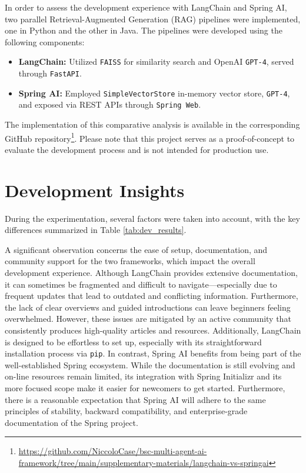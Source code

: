 In order to assess the development experience with LangChain and Spring AI, two parallel Retrieval-Augmented Generation (RAG) pipelines were implemented, one in Python and the other in Java. The pipelines were developed using the following components:

\begin{itemize}[leftmargin=*, label=--] 
    \item \textbf{LangChain:} Utilized \texttt{FAISS} for similarity search and OpenAI \texttt{GPT-4}, served through \texttt{FastAPI}. 
    \item \textbf{Spring AI:} Employed \texttt{SimpleVectorStore} in-memory vector store, \texttt{GPT-4}, and exposed via REST APIs through \texttt{Spring Web}. 
\end{itemize}
    
The implementation of this comparative analysis is available in the corresponding GitHub repository\footnote{\url{https://github.com/NiccoloCase/bsc-multi-agent-ai-framework/tree/main/supplementary-materials/langchain-vs-springai}}. Please note that this project serves as a proof-of-concept to evaluate the development process and is not intended for production use.


\section*{Development Insights}

During the experimentation, several factors were taken into account, with the key differences summarized in Table \ref{tab:dev_results}.

A significant observation concerns the ease of setup, documentation, and community support for the two frameworks, which impact the overall development experience. Although LangChain provides extensive documentation, it can sometimes be fragmented and difficult to navigate—especially due to frequent updates that lead to outdated and conflicting information. Furthermore, the lack of clear overviews and guided introductions can leave beginners feeling overwhelmed. 
However, these issues are mitigated by an active community that consistently produces high-quality articles and resources. Additionally, LangChain is designed to be effortless to set up, especially with its straightforward installation process via \texttt{pip}. In contrast, Spring AI benefits from being part of the well-established Spring ecosystem. While the documentation is still evolving and on-line resources remain limited, its integration with Spring Initializr and its more focused scope make it easier for newcomers to get started. Furthermore, there is a reasonable expectation that Spring AI will adhere to the same principles of stability, backward compatibility, and enterprise-grade documentation of the Spring project.

